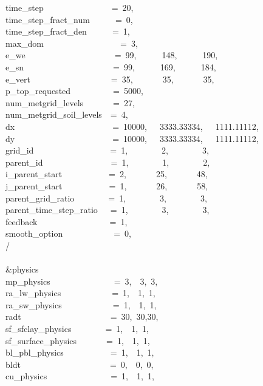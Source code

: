 time\_step~~~~~~~~~~~~~~~~=~20,\\
time\_step\_fract\_num~~~~~~=~0,\\
time\_step\_fract\_den~~~~~~=~1,\\
max\_dom~~~~~~~~~~~~~~~~~~=~3,\\
e\_we~~~~~~~~~~~~~~~~~~~~~=~99,~~~~~~148,~~~~~~190,\\
e\_sn~~~~~~~~~~~~~~~~~~~~~=~99,~~~~~~169,~~~~~~184,\\
e\_vert~~~~~~~~~~~~~~~~~~~=~35,~~~~~~~35,~~~~~~~35,~\\
p\_top\_requested~~~~~~~~~~=~5000,\\
num\_metgrid\_levels~~~~~~~=~27,\\
num\_metgrid\_soil\_levels~~=~4,\\
dx~~~~~~~~~~~~~~~~~~~~~~~=~10000,~~~3333.33334,~~~1111.11112,\\
dy~~~~~~~~~~~~~~~~~~~~~~~=~10000,~~~3333.33334,~~~1111.11112,\\
grid\_id~~~~~~~~~~~~~~~~~~=~1,~~~~~~~~2,~~~~~~~~3,\\
parent\_id~~~~~~~~~~~~~~~~=~1,~~~~~~~~1,~~~~~~~~2,\\
i\_parent\_start~~~~~~~~~~~=~2,~~~~~~~25,~~~~~~~48,\\
j\_parent\_start~~~~~~~~~~~=~1,~~~~~~~26,~~~~~~~58,\\
parent\_grid\_ratio~~~~~~~~=~1,~~~~~~~~3,~~~~~~~~3,\\
parent\_time\_step\_ratio~~~=~1,~~~~~~~~3,~~~~~~~~3,\\
feedback~~~~~~~~~~~~~~~~~=~1,\\
smooth\_option~~~~~~~~~~~~=~0,\\
/\\
\\
\&physics~~~~~~~~~~~~~~~~~\\
mp\_physics~~~~~~~~~~~~~~~=~3,~~3,~3,~\\
ra\_lw\_physics~~~~~~~~~~~~=~1,~~1,~1,~\\
ra\_sw\_physics~~~~~~~~~~~~=~1,~~1,~1,~\\
radt~~~~~~~~~~~~~~~~~~~~~=~30,~30,30,\\
sf\_sfclay\_physics~~~~~~~~=~1,~~1,~1,~\\
sf\_surface\_physics~~~~~~~=~1,~~1,~1,~\\
bl\_pbl\_physics~~~~~~~~~~~=~1,~~1,~1,~\\
bldt~~~~~~~~~~~~~~~~~~~~~=~0,~~0,~0,~\\
cu\_physics~~~~~~~~~~~~~~~=~1,~~1,~1,~\\

